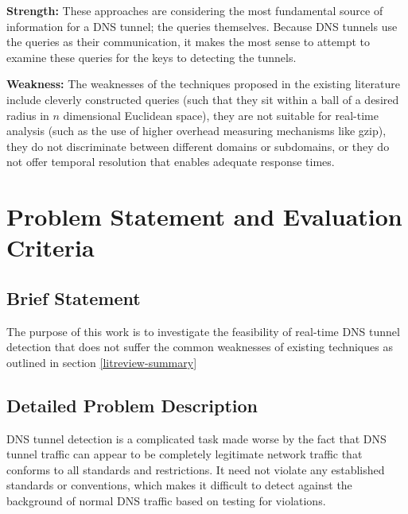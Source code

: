 \documentclass[12pt]{report}
\theoremstyle{remark}
\theoremstyle{definition}
\theoremstyle{definition}
\theoremstyle{definition}
\begin{document}
\begin{itemize}
\textbf{Strength:} These approaches are considering the most fundamental source
of information for a DNS tunnel; the queries themselves. Because DNS tunnels use
the queries as their communication, it makes the most sense to attempt to
examine these queries for the keys to detecting the tunnels.

\textbf{Weakness:} The weaknesses of the techniques proposed in the existing
literature include cleverly constructed queries (such that they sit within a
ball of a desired radius in $n$ dimensional Euclidean space), they are not
suitable for real-time analysis (such as the use of higher overhead measuring
mechanisms like gzip), they do not discriminate between different domains
or subdomains, or they do not offer temporal resolution that enables adequate 
response times.
\end{itemize}

\newpage
\chapter{Problem Statement and Evaluation Criteria}

\section{Brief Statement}
\label{briefproblem}
The purpose of this work is to
investigate the feasibility of real-time DNS tunnel detection that does not
suffer the common weaknesses of existing techniques as outlined in section
\ref{litreview-summary}

\section{Detailed Problem Description} DNS tunnel detection is a complicated
task made worse by the fact that DNS tunnel traffic can appear to be completely
legitimate network traffic that conforms to all standards and restrictions. It
need not violate any established standards or conventions, which makes it
difficult to detect against the background of normal DNS traffic based on
testing for violations.
\end{document}
